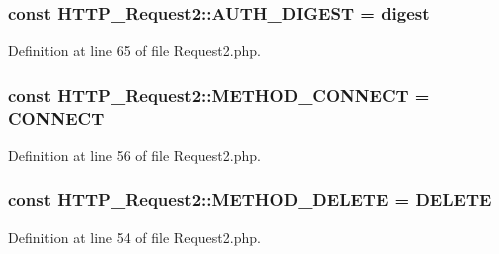 \subsubsection[{A\+U\+T\+H\+\_\+\+D\+I\+G\+E\+S\+T}]{\setlength{\rightskip}{0pt plus 5cm}const H\+T\+T\+P\+\_\+\+Request2\+::\+A\+U\+T\+H\+\_\+\+D\+I\+G\+E\+S\+T = \textquotesingle{}digest\textquotesingle{}}\label{classHTTP__Request2_a4b05b6842e05183dc3ac3c7ff613b3c7}


Definition at line 65 of file Request2.\+php.

\hypertarget{classHTTP__Request2_af03c573103c3f5bdf3ec9c3e95a08e59}{}
\subsubsection[{M\+E\+T\+H\+O\+D\+\_\+\+C\+O\+N\+N\+E\+C\+T}]{\setlength{\rightskip}{0pt plus 5cm}const H\+T\+T\+P\+\_\+\+Request2\+::\+M\+E\+T\+H\+O\+D\+\_\+\+C\+O\+N\+N\+E\+C\+T = \textquotesingle{}C\+O\+N\+N\+E\+C\+T\textquotesingle{}}\label{classHTTP__Request2_af03c573103c3f5bdf3ec9c3e95a08e59}


Definition at line 56 of file Request2.\+php.

\hypertarget{classHTTP__Request2_ab6edf309179aa4535aa6a9b12b260978}{}
\subsubsection[{M\+E\+T\+H\+O\+D\+\_\+\+D\+E\+L\+E\+T\+E}]{\setlength{\rightskip}{0pt plus 5cm}const H\+T\+T\+P\+\_\+\+Request2\+::\+M\+E\+T\+H\+O\+D\+\_\+\+D\+E\+L\+E\+T\+E = \textquotesingle{}D\+E\+L\+E\+T\+E\textquotesingle{}}\label{classHTTP__Request2_ab6edf309179aa4535aa6a9b12b260978}


Definition at line 54 of file Request2.\+php.

\hypertarget{classHTTP__Request2_a7c1f37cc2543c9d0fe5f09086bd50b3a}{}
